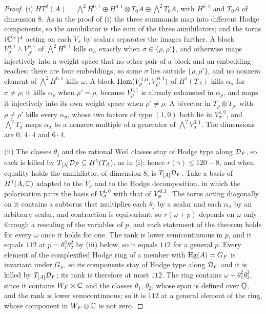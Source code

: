 \begin{proof}
(i) $HT^{2}(A)=\bigwedge^{2}H^{0,1}\oplus H^{0,1}\otimes T_{0}A\oplus
\bigwedge^{2}T_{0}A$, with $H^{0,1}$ and $T_{0}A$ of dimension $8$. As in the
proof of (i) the three summands map into different Hodge
components, so the annihilator is the sum of the three annihilators; and the
torus $(\mathbb{C}^{\times})^{4}$ acting on each $V_{\sigma}$ by scalars separates the
images further. A block $V_{\rho}^{0,1}\wedge V_{\rho'}^{0,1}$ of
$\bigwedge^{2}H^{0,1}$ kills $\alpha_{\sigma}$ exactly when
$\sigma\in\{\rho,\rho'\}$, and otherwise maps injectively into a weight space
that no other pair of a block and an embedding reaches; there are four
embeddings, so some $\sigma$ lies outside $\{\rho,\rho'\}$, and no nonzero
element of $\bigwedge^{2}H^{0,1}$ kills $\omega$. A block
$\operatorname{Hom}(V_{\rho}^{1,0},V_{\rho'}^{0,1})$ of $H^{1}(T_{A})$ kills $\alpha_{\sigma}$
for $\sigma\ne\rho$; it kills $\alpha_{\rho}$ when $\rho'=\rho$, because
$V_{\rho}^{0,1}$ is already exhausted in $\alpha_{\rho}$, and maps it
injectively into its own weight space when $\rho'\ne\rho$. A bivector in
$T_{\rho}\otimes T_{\rho'}$ with $\rho\ne\rho'$ kills every $\alpha_{\sigma}$,
whose two factors of type $(1,0)$ both lie in $V_{\sigma}^{1,0}$, and
$\bigwedge^{2}T_{\sigma}$ maps $\alpha_{\sigma}$ to a nonzero multiple of a
generator of $\bigwedge^{2}V_{\sigma}^{0,1}$. The dimensions are $0$,
$4\cdot4$ and $6\cdot4$.

(ii) The classes $\theta_{j}$ and the rational Weil classes stay of Hodge type
along $\mathcal{D}_{F}$, so each is killed by $T_{[A]}\mathcal{D}_{F}\subseteq H^{1}(T_{A})$, as
in (i); hence $r(\gamma)\le120-8$, and when equality
holds the annihilator, of dimension $8$, is $T_{[A]}\mathcal{D}_{F}$. Take a basis of
$H^{1}(A,\mathbb{C})$ adapted to the $V_{\sigma}$ and to the Hodge decomposition, in
which the polarisation pairs the basis of $V_{\sigma}^{1,0}$ with that of
$V_{\overline{\sigma}}^{0,1}$. The torus acting diagonally on it contains a subtorus
that multiplies each $\theta_{j}$ by a scalar and each $\alpha_{\sigma}$ by an
arbitrary scalar, and contraction is equivariant; so $r(\omega+p)$ depends on
$\omega$ only through a rescaling of the variables of $p$, and each statement
of the theorem holds for every $\omega$ once it holds for one. The rank is
lower semicontinuous in $p$, and it equals $112$ at
$p=\theta_{1}^{2}\theta_{2}^{2}$ by (iii) below, so it
equals $112$ for a general $p$. Every element of the complexified Hodge ring
of a member with $\operatorname{Hg}(A)=G_{F}$ is invariant under $G_{F}$, so its components
stay of Hodge type along $\mathcal{D}_{F}$ and it is killed by $T_{[A]}\mathcal{D}_{F}$; its
rank is therefore at most $112$. The ring contains $\omega+\theta_{1}^{2}
\theta_{2}^{2}$, since it contains $W_{F}\otimes\mathbb{C}$ and the classes
$\theta_{1}$, $\theta_{2}$, whose span is defined over $\mathbb{Q}$, and the rank
is lower semicontinuous; so it is $112$ at a general element of the ring, whose
component in $W_{F}\otimes\mathbb{C}$ is not zero.


\end{proof}
